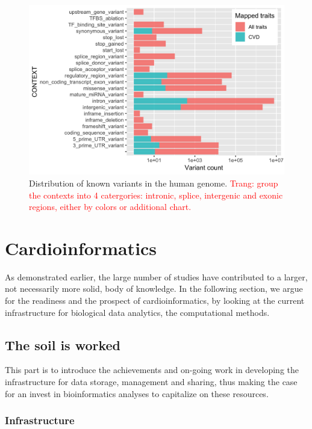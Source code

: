 \documentclass[letter]{bioinfo}
\newcommand{\comment}[1]{\textcolor{red}{#1}}
\begin{document}
\begin{figure}[!tpb]
	\includegraphics[width=1\linewidth]{variant_contexts_sigVars}
	\caption{Distribution of known variants in the human genome. \comment{Trang: group the contexts into 4 catergories: intronic, splice, intergenic and exonic regions, either by colors or additional chart.}}
	\label{fig:variant_context}
\end{figure}

%




%
\section{Cardioinformatics}
As demonstrated earlier, the large number of studies have contributed to a larger, not necessarily more solid, body of knowledge. In the following section, we argue for the readiness and the prospect of cardioinformatics, by looking at the current infrastructure for biological data analytics, the computational methods.

\subsection{The soil is worked}

This part is to introduce the achievements and on-going work in developing the infrastructure for data storage, management and sharing, thus making the case for an invest in bioinformatics analyses to capitalize on these resources.


\subsubsection{Infrastructure}
\end{document}

